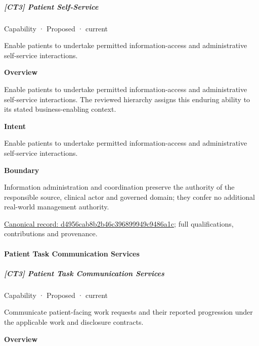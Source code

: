 \subparagraph{[CT3] Patient Self-Service}

\label{element:d4956cab8b2b46c396899949c9486a1c}
{\small Capability · Proposed · current}\par

Enable patients to undertake permitted information-access and administrative self-service interactions.



\textbf{Overview}



Enable patients to undertake permitted information-access and administrative self-service interactions. The reviewed hierarchy assigns this enduring ability to its stated business-enabling context.



\textbf{Intent}



Enable patients to undertake permitted information-access and administrative self-service interactions.



\textbf{Boundary}



Information administration and coordination preserve the authority of the responsible source, clinical actor and governed domain; they confer no additional real-world management authority.


{\footnotesize \href{../../../../continuum/strategy/capability/d4956cab8b2b46c396899949c9486a1c.md}{Canonical record: d4956cab8b2b46c396899949c9486a1c}; full qualifications, contributions and provenance.}\par
\paragraph{Patient Task Communication Services}

\subparagraph{[CT3] Patient Task Communication Services}

\label{element:ba8ce1d54ace4bc9aa3521dd954f36cb}
{\small Capability · Proposed · current}\par

Communicate patient-facing work requests and their reported progression under the applicable work and disclosure contracts.



\textbf{Overview}



